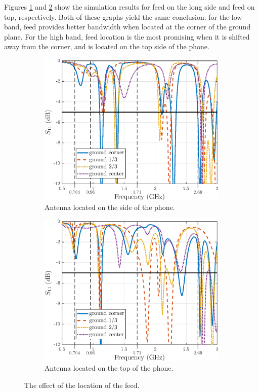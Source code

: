 Figures \ref{fig:feed_pos_side_res} and \ref{fig:feed_pos_top_res} show the simulation results for feed on the long side and feed on top, respectively. Both of these graphs yield the same conclusion: for the low band, feed provides better bandwidth when located at the corner of the ground plane. For the high band, feed location is the most promising when it is shifted away from the corner, and is located on the top side of the phone.

\begin{figure}[H]
    \centering
    \begin{subfigure}[b]{0.49\textwidth}
        \includegraphics[width=\textwidth]{img/feed_pos_side_res.eps}
        \caption{Antenna located on the side of the phone.}
        \label{fig:feed_pos_side_res}
    \end{subfigure}
    \begin{subfigure}[b]{0.49\textwidth}
        \includegraphics[width=\textwidth]{img/feed_pos_top_res.eps}
        \caption{Antenna located on the top of the phone.}
        \label{fig:feed_pos_top_res}
    \end{subfigure}
    \caption{The effect of the location of the feed.}
    \label{fig:feed_effect}
\end{figure}

